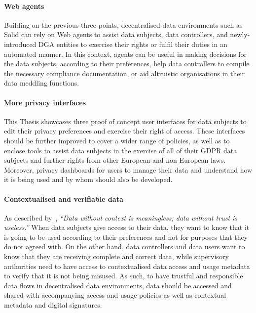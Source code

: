 \paragraph{Web agents} Building on the previous three points, decentralised data environments such as Solid can rely on Web agents to assist data subjects, data controllers, and newly-introduced DGA entities to exercise their rights or fulfil their duties in an automated manner. In this context, agents can be useful in making decisions for the data subjects, according to their preferences, help data controllers to compile the necessary compliance documentation, or aid altruistic organisations in their data meddling functions.

\paragraph{More privacy interfaces} This Thesis showcases three proof of concept user interfaces for data subjects to edit their privacy preferences and exercise their right of access. These interfaces should be further improved to cover a wider range of policies, as well as to enclose tools to assist data subjects in the exercise of all of their GDPR data subjects and further rights from other European and non-European laws. Moreover, privacy dashboards for users to manage their data and understand how it is being used and by whom should also be developed.

\paragraph{Contextualised and verifiable data} As described by~\cite{verborgh_rawdata_2023}, \textit{``Data without context is meaningless; data without trust is useless.''} When data subjects give access to their data, they want to know that it is going to be used according to their preferences and not for purposes that they do not agreed with. On the other hand, data controllers and data users want to know that they are receiving complete and correct data, while supervisory authorities need to have access to contextualised data access and usage metadata to verify that it is not being misused. As such, to have trustful and responsible data flows in decentralised data environments, data should be accessed and shared with accompanying access and usage policies as well as contextual metadata and digital signatures.

